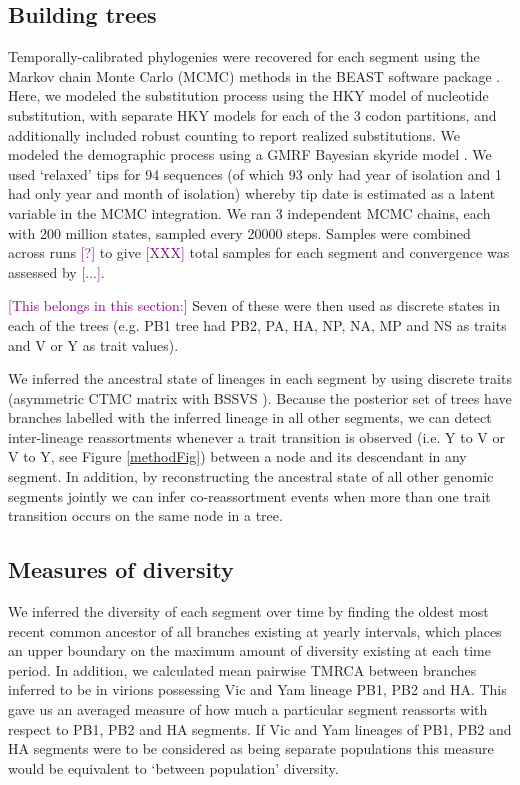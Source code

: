 \documentclass[11pt,oneside,letterpaper]{article}
\def\tbc#1{\textcolor{purple}{[#1]}}
\begin{document}
\subsection*{Building trees}
Temporally-calibrated phylogenies were recovered for each segment using the Markov chain Monte Carlo (MCMC) methods in the BEAST software package \cite{drummond2012}.
Here, we modeled the substitution process using the HKY model of nucleotide substitution, with separate HKY models for each of the 3 codon partitions, and additionally included robust counting \cite{obrien2009} to report realized substitutions.
We modeled the demographic process using a GMRF Bayesian skyride model \cite{minin2008}.
We used `relaxed' tips for 94 sequences (of which 93 only had year of isolation and 1 had only year and month of isolation) whereby tip date is estimated as a latent variable in the MCMC integration.
We ran 3 independent MCMC chains, each with 200 million states, sampled every 20000 steps.
Samples were combined across runs \tbc{?} to give \tbc{XXX} total samples for each segment and convergence was assessed by \tbc{...}.

\tbc{This belongs in this section:} Seven of these were then used as discrete states in each of the trees (e.g. PB1 tree had PB2, PA, HA, NP, NA, MP and NS as traits and V or Y as trait values).

We inferred the ancestral state of lineages in each segment by using discrete traits (asymmetric CTMC matrix with BSSVS \cite{lemey2009}). Because the posterior set of trees have branches labelled with the inferred lineage in all other segments, we can detect inter-lineage reassortments whenever a trait transition is observed (i.e. Y to V or V to Y, see Figure \ref{methodFig}) between a node and its descendant in any segment. 
In addition, by reconstructing the ancestral state of all other genomic segments jointly we can infer co-reassortment events when more than one trait transition occurs on the same node in a tree.

\subsection*{Measures of diversity}
We inferred the diversity of each segment over time by finding the oldest most recent common ancestor of all branches existing at yearly intervals, which places an upper boundary on the maximum amount of diversity existing at each time period.
In addition, we calculated mean pairwise TMRCA between branches inferred to be in virions possessing Vic and Yam lineage PB1, PB2 and HA.
This gave us an averaged measure of how much a particular segment reassorts with respect to PB1, PB2 and HA segments.
If Vic and Yam lineages of PB1, PB2 and HA segments were to be considered as being separate populations this measure would be equivalent to `between population' diversity.
\end{document}

